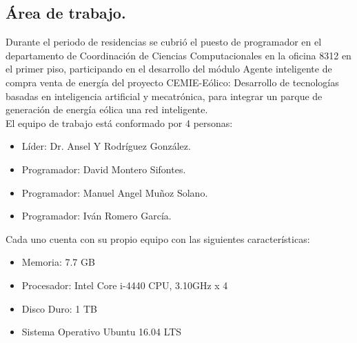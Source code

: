 \subsection{Área de trabajo.}

Durante el periodo de residencias se cubrió el puesto de programador en el departamento de Coordinación de Ciencias Computacionales en la oficina 8312 en el primer piso, participando en el desarrollo del módulo Agente inteligente de compra venta de energía del proyecto CEMIE-Eólico: Desarrollo de tecnologías basadas en inteligencia artificial y mecatrónica, para integrar un parque de generación de energía eólica una red inteligente.
\\

El equipo de trabajo está conformado por 4 personas:
\begin{itemize}
    \item Líder: Dr. Ansel Y Rodríguez González. 
    \item Programador: David Montero Sifontes.
    \item Programador: Manuel Angel Muñoz Solano.
    \item Programador: Iván Romero García.
\end{itemize}
 
Cada uno cuenta con su propio equipo con las siguientes características:

\begin{itemize}
    \item Memoria: 7.7 GB
    \item Procesador: Intel Core i-4440 CPU, 3.10GHz x 4
    \item Disco Duro: 1 TB
    \item Sistema Operativo Ubuntu 16.04 LTS
\end{itemize} 

